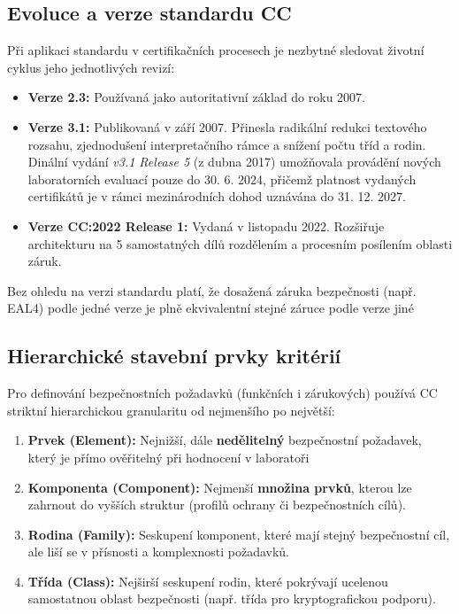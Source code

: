 \documentclass[10pt,a4paper]{article}
\begin{document}
	\subsection{Evoluce a verze standardu CC}
	Při aplikaci standardu v certifikačních procesech je nezbytné sledovat životní cyklus jeho jednotlivých revizí:
	\begin{itemize}
		\item \textbf{Verze 2.3:} Používaná jako autoritativní základ do roku 2007.
		\item \textbf{Verze 3.1:} Publikovaná v září 2007. Přinesla radikální redukci textového rozsahu, zjednodušení interpretačního rámce a snížení počtu tříd a rodin. 
		Dinální vydání \textit{v3.1 Release 5} (z dubna 2017) umožňovala provádění nových laboratorních evaluací pouze do 30. 6. 2024, přičemž platnost vydaných certifikátů je v rámci mezinárodních dohod uznávána do 31. 12. 2027.
		\item \textbf{Verze CC:2022 Release 1:} Vydaná v listopadu 2022. Rozšiřuje architekturu na 5 samostatných dílů rozdělením a procesním posílením oblasti záruk.
	\end{itemize}
	Bez ohledu na verzi standardu platí, že dosažená záruka bezpečnosti (např. EAL4) podle jedné verze je plně ekvivalentní stejné záruce podle verze jiné
	
	\subsection{Hierarchické stavební prvky kritérií}
	Pro definování bezpečnostních požadavků (funkčních i zárukových) používá CC striktní hierarchickou granularitu od nejmenšího po největší:
	\begin{enumerate}
		\item \textbf{Prvek (Element):} Nejnižší, dále \textbf{nedělitelný} bezpečnostní požadavek, který je přímo ověřitelný při hodnocení v laboratoři
		
		\item \textbf{Komponenta (Component):} Nejmenší \textbf{množina prvků}, kterou lze zahrnout do vyšších struktur (profilů ochrany či bezpečnostních cílů).
		
		\item \textbf{Rodina (Family):} Seskupení komponent, které mají stejný bezpečnostní cíl, ale liší se v přísnosti a komplexnosti požadavků.
		
		\item \textbf{Třída (Class):} Nejširší seskupení rodin, které pokrývají ucelenou samostatnou oblast bezpečnosti (např. třída pro kryptografickou podporu).		
	\end{enumerate}
	
\end{document}
